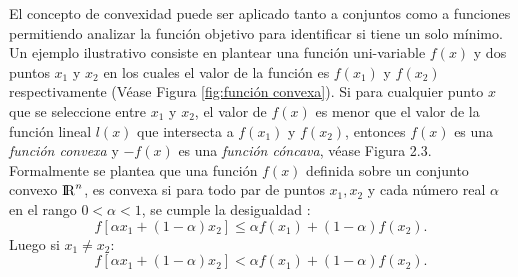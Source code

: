 El concepto de convexidad puede ser aplicado tanto a conjuntos como a funciones permitiendo analizar la función objetivo para identificar si tiene un solo mínimo. Un ejemplo ilustrativo consiste en plantear una función uni-variable $f(x)$ y dos puntos $x_1$ y $x_2$ en los cuales el valor de la función es $f(x_1)$ y $f(x_2)$ respectivamente (Véase Figura \ref{fig:función convexa}). Si para cualquier punto $x$ que se seleccione entre $x_1$ y $x_2$, el valor de $f(x)$ es menor que el valor de la función lineal $l(x)$ que intersecta a $f(x_1)$ y $f(x_2)$, entonces $f(x)$ es una \textit{función convexa} y $-f(x)$ es una \textit{función cóncava}, véase Figura 2.3.  
Formalmente se plantea que una función $f(x)$ definida sobre un conjunto convexo ${\rm I\!R}^{n}$,  es convexa si para todo par de puntos $x_1, x_2$  y cada número real $\alpha$ en el rango $0 < \alpha <1$, se cumple la desigualdad \cite{antoniou_practical_2007}: 
\begin{equation}
f [\alpha x_1 + ( 1-\alpha) x_2]  \leq \alpha f(x_1) + (1-\alpha) f (x_2). 
\end{equation}
Luego si $x_1 \neq x_2$:
\begin{equation}
f [\alpha x_1 + ( 1-\alpha) x_2]  < \alpha f(x_1) + (1-\alpha) f (x_2). 
\end{equation}



